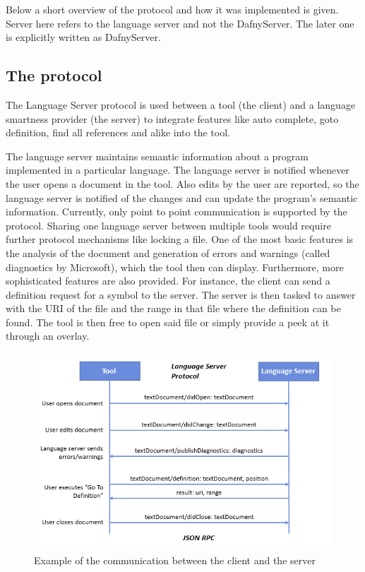 Below a short overview of the protocol and how it was implemented is given. Server here refers to the language server and not the DafnyServer. The later one is explicitly written as DafnyServer.

\subsection{The protocol}
The Language Server protocol is used between a tool (the client) and a language smartness provider (the server) to integrate features like auto complete, goto definition, find all references and alike into the tool. \cite{langserver} \newline

The language server maintains semantic information about a program implemented in a particular language. The language server is notified whenever the user opens a document in the tool. Also edits by the user are reported, so the language server is notified of the changes and can update the program's semantic information. Currently, only point to point communication is supported by the protocol. Sharing one language server between multiple tools would require further protocol mechanisms like locking a file.\newline
One of the most basic features is the analysis of the document and generation of errors and warnings (called diagnostics by Microsoft), which the tool then can display. Furthermore, more sophisticated features are also provided. For instance, the client can send a definition request for a symbol to the server. The server is then tasked to answer with the URI of the file and the range in that file where the definition can be found. The tool is then free to open said file or simply provide a peek at it through an overlay. \newline

\begin{figure}[H]
	\centering
	\includegraphics[width=1\textwidth]{img/langServerOverview}
	\caption{Example of the communication between the client and the server}
	\label{fig:langserveroverview}
\end{figure}


